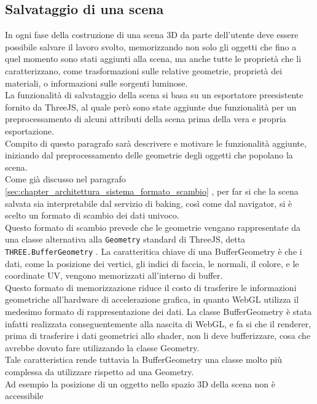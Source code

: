 \subsection{Salvataggio di una scena}
\label{sec:chapter_creazione_scena_funzionalita_editor_salvataggio_scena}
In ogni fase della costruzione di una scena 3D da parte dell’utente deve essere possibile salvare il lavoro svolto, memorizzando non solo gli oggetti che fino a quel momento sono stati aggiunti alla scena, ma anche tutte le proprietà che li caratterizzano, come trasformazioni sulle relative geometrie, proprietà dei materiali, o informazioni sulle sorgenti luminose. 
\\
La funzionalità di salvataggio della scena si basa su un esportatore preesistente fornito da ThreeJS, al quale però sono state aggiunte due funzionalità per un preprocessamento di alcuni attributi della scena prima della vera e propria esportazione.
\\
Compito di questo paragrafo sarà descrivere e motivare le funzionalità aggiunte, iniziando dal preprocessamento delle geometrie degli oggetti che popolano la scena.
\\
Come già discusso nel paragrafo \ref{sec:chapter_architettura_sistema_formato_scambio} , per far si che la scena salvata sia interpretabile dal servizio di baking, così come dal navigator, si è scelto un formato di scambio dei dati univoco.
\\ 
Questo formato di scambio prevede che le geometrie vengano rappresentate da una classe alternativa alla \texttt{Geometry} standard di ThreeJS, detta \texttt{THREE.BufferGeometry} .
La caratteritica chiave di una BufferGeometry è che i dati, come la posizione dei vertici, gli indici di faccia, le normali, il colore, e le coordinate UV, vengono memorizzati all’interno di buffer. 
\\
Questo formato di memorizzazione riduce il costo di trasferire le informazioni geometriche all’hardware di accelerazione grafica, in quanto WebGL utilizza il medesimo formato di rappresentazione dei dati. La classe BufferGeometry è stata infatti realizzata conseguentemente alla nascita di WebGL, e fa si che il renderer, prima di trasferire i dati geometrici allo shader, non li deve bufferizzare, cosa che avrebbe dovuto fare utilizzando la classe Geometry.
\\
Tale caratteristica rende tuttavia la BufferGeometry una classe molto più complessa da utilizzare rispetto ad una Geometry.
\\
Ad esempio la posizione di un oggetto nello spazio 3D della scena non è accessibile
